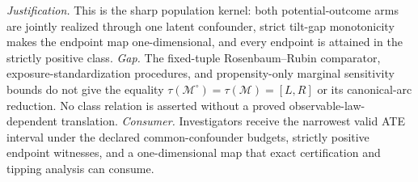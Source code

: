 \documentclass{article}
\begin{document}
\par\smallskip\noindent \textit{Justification.} This is the sharp population kernel: both potential-outcome arms are jointly realized through one latent confounder, strict tilt-gap monotonicity makes the endpoint map one-dimensional, and every endpoint is attained in the strictly positive class. \textit{Gap.} The fixed-tuple Rosenbaum--Rubin comparator, exposure-standardization procedures, and propensity-only marginal sensitivity bounds do not give the equality \(\tau(\mathcal M^{\circ})=\tau(\mathcal M)=[L,R]\) or its canonical-arc reduction.  No class relation is asserted without a proved observable-law-dependent translation. \textit{Consumer.} Investigators receive the narrowest valid ATE interval under the declared common-confounder budgets, strictly positive endpoint witnesses, and a one-dimensional map that exact certification and tipping analysis can consume.
\end{document}
